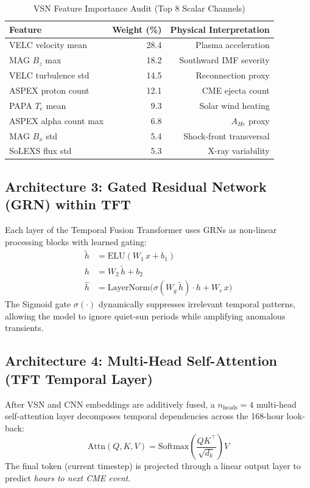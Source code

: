 \documentclass[conference,10pt,twocolumn]{IEEEtran}
\begin{document}
\begin{table}[htbp]
\caption{VSN Feature Importance Audit (Top 8 Scalar Channels)}
\begin{center}
\renewcommand{\arraystretch}{1.2}
\begin{tabular}{@{}lrr@{}}
\toprule
\textbf{Feature} & \textbf{Weight (\%)} & \textbf{Physical Interpretation} \\
\midrule
VELC velocity mean     & 28.4 & Plasma acceleration \\
MAG $B_z$ max          & 18.2 & Southward IMF severity \\
VELC turbulence std    & 14.5 & Reconnection proxy \\
ASPEX proton count     & 12.1 & CME ejecta count \\
PAPA $T_e$ mean        & 9.3  & Solar wind heating \\
ASPEX alpha count max  & 6.8  & $A_{He}$ proxy \\
MAG $B_x$ std          & 5.4  & Shock-front transversal \\
SoLEXS flux std        & 5.3  & X-ray variability \\
\bottomrule
\end{tabular}
\label{tab:vsn}
\end{center}
\end{table}

\subsection{Architecture 3: Gated Residual Network (GRN) within TFT}
Each layer of the Temporal Fusion Transformer \cite{b28} uses GRNs as non-linear processing blocks with learned gating:
\begin{align}
\tilde{h} &= \text{ELU}(W_1\,x + b_1) \\
h  &= W_2\,\tilde{h} + b_2 \\
\hat{h} &= \text{LayerNorm}\bigl(\sigma(W_g\,\tilde{h}) \cdot h + W_r\,x\bigr)
\label{eq:grn}
\end{align}
The Sigmoid gate $\sigma(\cdot)$ dynamically suppresses irrelevant temporal patterns, allowing the model to ignore quiet-sun periods while amplifying anomalous transients.

\subsection{Architecture 4: Multi-Head Self-Attention (TFT Temporal Layer)}
After VSN and CNN embeddings are additively fused, a $n_{\text{heads}} = 4$ multi-head self-attention layer \cite{b27} decomposes temporal dependencies across the 168-hour look-back:
\begin{equation}
\text{Attn}(Q,K,V) = \text{Softmax}\!\left(\frac{QK^\top}{\sqrt{d_k}}\right) V
\label{eq:attention}
\end{equation}
The final token (current timestep) is projected through a linear output layer to predict \textit{hours to next CME event}.
\end{document}
